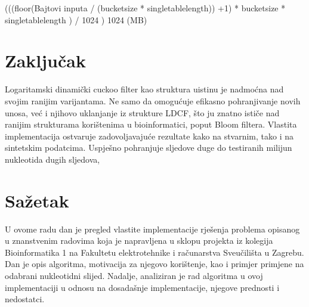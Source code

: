 \documentclass[times, utf8, seminar, numeric]{fer}
\begin{document}
(((floor(Bajtovi inputa / (bucketsize * singletablelength)) +1) * bucketsize * singletablelength ) / 1024 ) 1024 (MB)

\pagebreak



\chapter{Zaključak}

Logaritamski dinamički cuckoo filter kao struktura uistinu je nadmoćna nad svojim ranijim varijantama. Ne samo da omogućuje efikasno pohranjivanje novih unosa, već i njihovo uklanjanje iz strukture LDCF, što ju znatno ističe nad ranijim strukturama korištenima u bioinformatici, poput Bloom filtera. Vlastita implementacija ostvaruje zadovoljavajuće rezultate kako na stvarnim, tako i na sintetskim podatcima. Uspješno pohranjuje sljedove duge do testiranih milijun nukleotida dugih sljedova, 




\chapter{Sažetak}

U ovome radu dan je pregled vlastite implementacije rješenja problema opisanog u znanstvenim radovima koja je napravljena u sklopu projekta iz kolegija Bioinformatika 1 na Fakultetu elektrotehnike i računarstva Sveučilišta u Zagrebu. Dan je opis algoritma, motivacija za njegovo korištenje, kao i primjer primjene na odabrani nukleotidni slijed. Nadalje, analiziran je rad algoritma u ovoj implementaciji u odnosu na dosadašnje implementacije, njegove prednosti i nedostatci. \\
\end{document}
